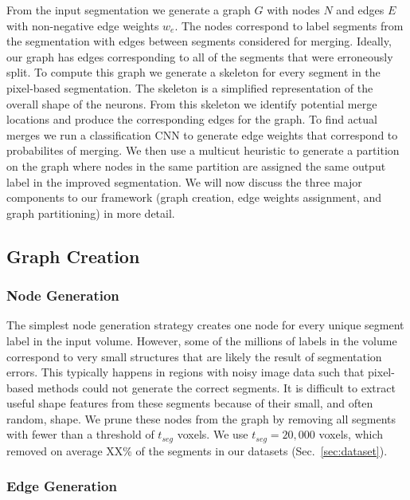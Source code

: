 From the input segmentation we generate a graph $G$ with nodes $N$ and edges $E$ with non-negative edge weights $w_e$. The nodes correspond to label segments from the segmentation with edges between segments considered for merging. Ideally, our graph has edges corresponding to all of the segments that were erroneously split. To compute this graph we generate a skeleton for every segment in the pixel-based segmentation. The skeleton is a simplified representation of the overall shape of the neurons. From this skeleton we  identify potential merge locations and produce the corresponding edges for the graph. To find actual merges we run a classification CNN to generate edge weights that correspond to probabilites of merging. We then use a multicut heuristic to generate a partition on the graph where nodes in the same partition are assigned the same output label in the improved segmentation. We will now discuss the three major components to our framework (graph creation, edge weights assignment, and graph partitioning) in more detail.

\subsection{Graph Creation}
\label{sec:skeletonization}

\subsubsection{Node Generation}

The simplest node generation strategy creates one node for every unique segment label in the input volume. However, some of the millions of labels in the volume correspond to very small structures that are likely the result of segmentation errors. This typically happens in regions with noisy image data such that pixel-based methods could not generate the correct segments. It is difficult to extract useful shape features from these segments because of their small, and often random, shape. We prune these nodes from the graph by removing all segments with fewer than a threshold of $t_{seg}$ voxels. We use $t_{seg} = 20,000$ voxels, which removed on average XX\%  of the segments in our  datasets (Sec.~\ref{sec:dataset}).

\subsubsection{Edge Generation}

